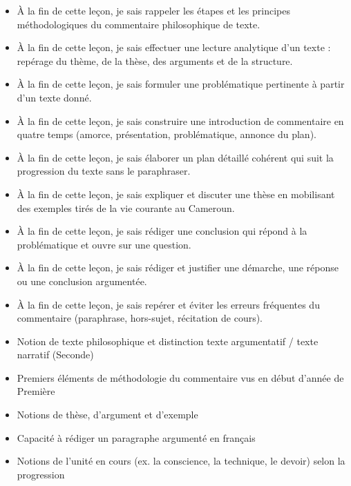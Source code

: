 \documentclass[11pt]{article}
\begin{document}
\begin{objectifs}
\begin{itemize}
\item À la fin de cette leçon, je sais rappeler les étapes et les principes méthodologiques du commentaire philosophique de texte.
\item À la fin de cette leçon, je sais effectuer une lecture analytique d'un texte : repérage du thème, de la thèse, des arguments et de la structure.
\item À la fin de cette leçon, je sais formuler une problématique pertinente à partir d'un texte donné.
\item À la fin de cette leçon, je sais construire une introduction de commentaire en quatre temps (amorce, présentation, problématique, annonce du plan).
\item À la fin de cette leçon, je sais élaborer un plan détaillé cohérent qui suit la progression du texte sans le paraphraser.
\item À la fin de cette leçon, je sais expliquer et discuter une thèse en mobilisant des exemples tirés de la vie courante au Cameroun.
\item À la fin de cette leçon, je sais rédiger une conclusion qui répond à la problématique et ouvre sur une question.
\item À la fin de cette leçon, je sais rédiger et justifier une démarche, une réponse ou une conclusion argumentée.
\item À la fin de cette leçon, je sais repérer et éviter les erreurs fréquentes du commentaire (paraphrase, hors-sujet, récitation de cours).
\end{itemize}
\end{objectifs}

\begin{prerequis}
\begin{itemize}
\item Notion de texte philosophique et distinction texte argumentatif / texte narratif (Seconde)
\item Premiers éléments de méthodologie du commentaire vus en début d'année de Première
\item Notions de thèse, d'argument et d'exemple
\item Capacité à rédiger un paragraphe argumenté en français
\item Notions de l'unité en cours (ex. la conscience, la technique, le devoir) selon la progression
\end{itemize}
\end{prerequis}
\end{document}
